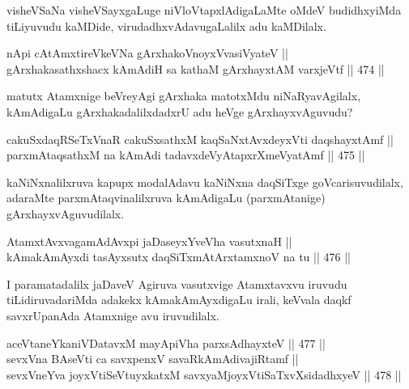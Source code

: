 \begin{artha}
visheVSaNa visheVSayxgaLuge niVloVtapxlAdigaLaMte oMdeV budidhxyiMda
tiLiyuvudu kaMDide, virudadhxvAdavugaLalilx adu kaMDilalx.
\end{artha}

\begin{shl}
nApi cA\s \s tAmxtireVkeVNa gArxhakoV\s noyxV\s vasiVyateV || \\
gArxhakasathxshacx kAmAdiH sa kathaM gArxhayxtAM varxjeVtf \hfill || 474 ||  
\end{shl}

\begin{artha}
matutx Atamxnige beVreyAgi gArxhaka matotxMdu niNaRyavAgilalx,
kAmAdigaLu gArxhakadalilxdadxrU adu heVge gArxhayxvAguvudu?
\end{artha}


\begin{shl}
cakuSxdaqRSeTxVnaR cakuSxsathxM kaqSaNxtAvxdeyxVti daqshayxtAmf || \\
parxmAtaqsathxM na kAmAdi tadavxdeVyAtapxrXmeVyatAmf \hfill || 475 ||  
\end{shl}

\begin{artha}
kaNiNxnalilxruva kapupx modalAdavu kaNiNxna daqSiTxge
goVcarisuvudilalx, adaraMte parxmAtaqvinalilxruva kAmAdigaLu
(parxmAtanige) gArxhayxvAguvudilalx.
\end{artha}

\begin{shl}
AtamxtAvxvagamAdAvx\s pi jaDaseyxYveVha vasutxnaH ||  \\
kAmakAmAyxdi tasAyxsutx daqSiTxmAtArxtamxnoV na tu \hfill || 476 ||  
\end{shl}

\begin{artha}
I paramatadalilx jaDaveV Agiruva vasutxvige Atamxtavxvu iruvudu
tiLidiruvadariMda adakekx kAmakAmAyxdigaLu irali, keVvala daqkf
savxrUpanAda Atamxnige avu iruvudilalx.
\end{artha}


\begin{shl}
aceVtaneYkaniVDatavxM mayA\s piVha parxsAdhayxteV \hfill || 477 ||  \\
sevxVna BAseVti ca savxpenxV savaRkAmAdivajiRtamf || \\
sevxVneYva joyxVtiSeVtuyxkatxM savxyaMjoyxVtiSaTxvXsidadhxyeV \hfill || 478 ||  
\end{shl}

